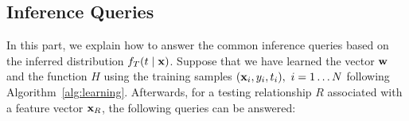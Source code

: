 

\subsection{Inference Queries}
In this part, we explain how to answer the common inference queries based on the inferred distribution $f_T(t\mid \mathbf{x})$. Suppose that we have learned the vector ${\mathbf{w}}$ and the function ${H}$ using the training samples $(\mathbf{x}_i, y_i, t_i),\ i=1\dots N$ following Algorithm~\ref{alg:learning}. Afterwards, for a testing relationship $R$ associated with a feature vector $\mathbf{x}_R$, the following queries can be answered:\\


